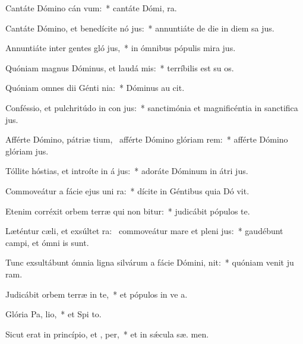 \item Cantáte Dómino cán vum:~* cantáte Dómi,  ra.
\item Cantáte Dómino, et benedícite nó jus:~* annuntiáte de die in diem sa jus.
\item Annuntiáte inter gentes gló jus,~* in ómnibus pópulis mira jus.
\item Quóniam magnus Dóminus, et laudá mis:~* terríbilis est su  os.
\item Quóniam omnes dii Génti nia:~* Dóminus au  cit.
\item Conféssio, et pulchritúdo in con jus:~* sanctimónia et magnificéntia in sanctifica jus.
\item Afférte Dómino, pátriæ tium,~\pscross{} afférte Dómino glóriam  rem:~* afférte Dómino glóriam  jus.
\item Tóllite hóstias, et introíte in á jus:~* adoráte Dóminum in átri  jus.
\item Commoveátur a fácie ejus uni ra:~* dícite in Géntibus quia Dó vit.
\item Etenim corréxit orbem terræ qui non bitur:~* judicábit pópulos  te.
\item Læténtur cæli, et exsúltet ra:~\pscross{} commoveátur mare et pleni jus:~* gaudébunt campi, et ómni   is sunt.
\item Tunc exsultábunt ómnia ligna silvárum a fácie Dómini,  nit:~* quóniam venit ju ram.
\item Judicábit orbem terræ in te,~* et pópulos in ve a.
\item Glória Pa,  lio,~* et Spi to.
\item Sicut erat in princípio, et ,  per,~* et in sǽcula sæ. men.
